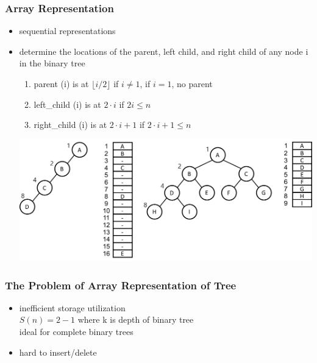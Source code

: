 \documentclass[newPxFont,sthlmFooter,nooffset]{beamer}
\begin{document}
\begin{frame}[t]
  \frametitle{Array Representation}
  \begin{itemize}
  \item sequential representations
  \item determine the locations of the parent, left child, and right
    child of any node i in the binary tree
    \begin{enumerate}
    \item parent (i) is at $\lfloor i/2 \rfloor$ if $i \neq 1$, if $i = 1$, no parent
    \item left\_child (i) is at $2 \cdot i$ if $2i \leq n$
    \item right\_child (i) is at $2 \cdot i + 1$ if $2 \cdot i+1 \leq n$

    \end{enumerate}
        \includegraphics[height=0.5\textheight]{figures/fig07_skewed_array.png}
  \end{itemize}


\end{frame}


\begin{frame}[t]
  \frametitle{The Problem of Array Representation of Tree}
  \begin{itemize}
  \item inefficient storage utilization \\
        $S(n) = 2 -1$ where k is  depth of binary tree\\
         ideal for complete binary trees
  \item hard to insert/delete
  \end{itemize}

\end{frame}
\end{document}

